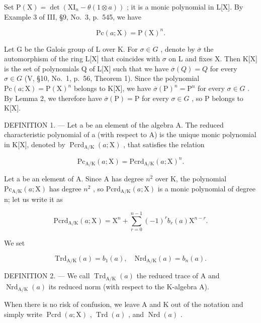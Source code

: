Set \(\mathrm{P}(\mathrm{X})=\det(\mathrm{XI}_{n}-\theta(1\otimes a))\) ; it is a monic polynomial in L{[}X{]}. By Example 3 of III, §9, No.~3, p.~545, we have

\[
\mathrm{Pc} (a; \mathrm{X}) = \mathrm{P} (\mathrm{X}) ^ {n}.\tag{19}
\]

Let G be the Galois group of L over K. For \(\sigma\in G\) , denote by \(\overline{\sigma}\) the automorphism of the ring L{[}X{]} that coincides with \(\sigma\) on L and fixes X. Then K{[}X{]} is the set of polynomials Q of L{[}X{]} such that we have \(\overline{\sigma}(Q)=Q\) for every \(\sigma\in G\) (V, §10, No.~1, p.~56, Theorem 1). Since the polynomial \(\mathrm{Pc}(a;\mathrm{X})=\mathrm{P}(\mathrm{X})^{n}\) belongs to K{[}X{]}, we have \(\overline{\sigma}(\mathrm{P})^{n}=\mathrm{P}^{n}\) for every \(\sigma\in G\) . By Lemma 2, we therefore have \(\overline{\sigma}(\mathrm{P})=\mathrm{P}\) for every \(\sigma\in G\) , so P belongs to K{[}X{]}.

DEFINITION 1. --- Let a be an element of the algebra A. The reduced characteristic polynomial of a (with respect to A) is the unique monic polynomial in K{[}X{]}, denoted by \(\operatorname{Pcrd}_{\mathrm{A}/\mathrm{K}}(a;\mathrm{X})\) , that satisfies the relation

\[
\mathrm{Pc} _ {\mathrm{A/K}} (a; \mathrm{X}) = \mathrm{Pcrd} _ {\mathrm{A/K}} (a; \mathrm{X}) ^ {n}.\tag{20}
\]

Let a be an element of A. Since A has degree \(n^{2}\) over K, the polynomial \(\mathrm{Pc}_{\mathrm{A/K}}(a;\mathrm{X})\) has degree \(n^{2}\) , so \(\mathrm{Pcrd}_{\mathrm{A/K}}(a;\mathrm{X})\) is a monic polynomial of degree n; let us write it as

\[
\mathrm{Pcrd} _ {\mathrm{A/K}} (a; \mathrm{X}) = \mathrm{X} ^ {n} + \sum_ {r = 0} ^ {n - 1} (- 1) ^ {r} b _ {r} (a) \mathrm{X} ^ {n - r}.\tag{21}
\]

We set

\[
\mathrm{Trd} _ {\mathrm{A/K}} (a) = b _ {1} (a), \quad \mathrm{Nrd} _ {\mathrm{A/K}} (a) = b _ {n} (a).\tag{22}
\]

DEFINITION 2. --- We call \(\operatorname{Trd}_{\mathrm{A/K}}(a)\) the reduced trace of A and \(\operatorname{Nrd}_{\mathrm{A/K}}(a)\) its reduced norm (with respect to the K-algebra A).

When there is no risk of confusion, we leave A and K out of the notation and simply write \(\operatorname{Pcrd}(a; \mathrm{X})\) , \(\operatorname{Trd}(a)\) , and \(\operatorname{Nrd}(a)\) .

